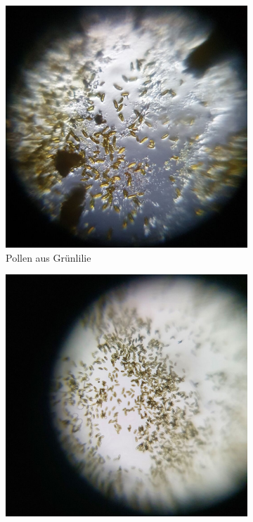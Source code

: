 \begin{figure}[H]
\begin{subfigure}[b]{0.3\textwidth}
				\includegraphics[width=\textwidth]{images/tv2/probe_Gruenlilie.jpg}
				\caption{Pollen aus Grünlilie}
				\label{fig:pollen-g}
			\end{subfigure}
			\hspace{5pt}
			\begin{subfigure}[b]{0.3\textwidth}
				\includegraphics[width=\textwidth]{images/tv2/probe_Weidenpollen.jpg}

\end{subfigure}
\end{figure}
